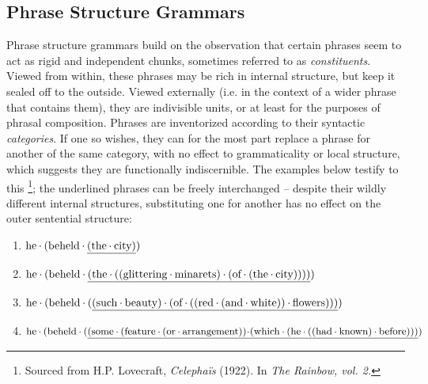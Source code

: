 \subsection{Phrase Structure Grammars}
Phrase structure grammars build on the observation that certain phrases seem to act as rigid and independent chunks, sometimes referred to as \textit{constituents}. 
Viewed from within, these phrases may be rich in internal structure, but keep it sealed off to the outside.
Viewed externally (i.e. in the context of a wider phrase that contains them), they are indivisible units, or at least for the purposes of phrasal composition.
Phrases are inventorized according to their syntactic \textit{categories}.
If one so wishes, they can for the most part replace a phrase for another of the same category, with no effect to grammaticality or local structure, which suggests they are functionally indiscernible.
The examples below testify to this%
\footnote{Sourced from H.P. Lovecraft, \textit{Celepha\"{i}s}  (1922). In \textit{The Rainbow, vol. 2.}}; the underlined phrases can be freely interchanged -- despite their wildly different internal structures, substituting one for another has no effect on the outer sentential structure:

{\smaller%
\begin{enumerate}
\item $\text{he}\mkern-0.5mu\cdot\mkern-0.5mu (\text{beheld}\mkern-0.5mu\cdot\mkern-0.5mu \underline{(\text{the}\mkern-0.5mu\cdot\mkern-0.5mu \text{city})})$
\item $\text{he}\mkern-0.5mu\cdot\mkern-0.5mu (\text{beheld}\mkern-0.5mu\cdot\mkern-0.5mu \underline{(\text{the}\mkern-0.5mu\cdot\mkern-0.5mu ((\text{glittering}\mkern-0.5mu\cdot\mkern-0.5mu {\text{minarets}})\mkern-0.5mu\cdot\mkern-0.5mu (\text{of}\mkern-0.5mu\cdot\mkern-0.5mu (\text{the}\mkern-0.5mu\cdot\mkern-0.5mu \text{city}))))})$
\item $\text{he}\mkern-0.5mu\cdot\mkern-0.5mu (\text{beheld}\mkern-0.5mu\cdot\mkern-0.5mu (\underline{(\text{such}\mkern-0.5mu\cdot\mkern-0.5mu \text{beauty})\mkern-0.5mu\cdot\mkern-0.5mu (\text{of}\mkern-0.5mu\cdot\mkern-0.5mu ((\text{red}\mkern-0.5mu\cdot\mkern-0.5mu (\text{and}\mkern-0.5mu\cdot\mkern-0.5mu \text{white}))\mkern-0.5mu\cdot\mkern-0.5mu \text{flowers})))})$
\item $\text{he}\mkern-0.5mu\cdot\mkern-0.5mu (\text{beheld}\mkern-0.5mu\cdot\mkern-0.5mu (\underline{
	(
		\text{some}\mkern-0.5mu\cdot\mkern-0.5mu 
			(\text{feature}\mkern-0.5mu\cdot\mkern-0.5mu 
				(\text{or}\mkern-0.5mu\cdot\mkern-0.5mu \text{arrangement})
			)\!\mkern-0.5mu\cdot\mkern-0.5mu \!
			(\text{which}\mkern-0.5mu\cdot\mkern-0.5mu 
				(\text{he}\mkern-0.5mu\cdot\mkern-0.5mu 
					(
						(\text{had}\mkern-0.5mu\cdot\mkern-0.5mu \text{known})\mkern-0.5mu\cdot\mkern-0.5mu 
						\text{before}
					)					
				)
			)})$
\end{enumerate}}%

